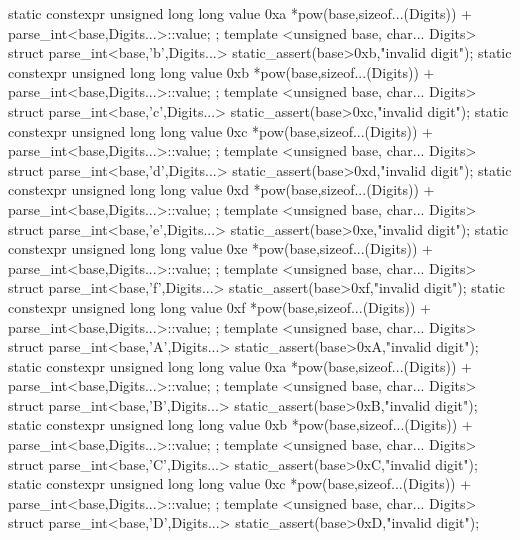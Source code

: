 \documentclass[ebook,11pt,article]{memoir}
\begin{document}
\begin{codeblock}
{{{{    static constexpr unsigned long long value{ 0xa *pow(base,sizeof...(Digits))
                                               + parse_int<base,Digits...>::value};
};
template <unsigned base, char... Digits>
struct parse_int<base,'b',Digits...>{
    static_assert(base>0xb,"invalid digit");
    static constexpr unsigned long long value{ 0xb *pow(base,sizeof...(Digits))
                                               + parse_int<base,Digits...>::value};
};
template <unsigned base, char... Digits>
struct parse_int<base,'c',Digits...>{
    static_assert(base>0xc,"invalid digit");
    static constexpr unsigned long long value{ 0xc *pow(base,sizeof...(Digits))
                                               + parse_int<base,Digits...>::value};
};
template <unsigned base, char... Digits>
struct parse_int<base,'d',Digits...>{
    static_assert(base>0xd,"invalid digit");
    static constexpr unsigned long long value{ 0xd *pow(base,sizeof...(Digits))
                                               + parse_int<base,Digits...>::value};
};
template <unsigned base, char... Digits>
struct parse_int<base,'e',Digits...>{
    static_assert(base>0xe,"invalid digit");
    static constexpr unsigned long long value{ 0xe *pow(base,sizeof...(Digits))
                                               + parse_int<base,Digits...>::value};
};
template <unsigned base, char... Digits>
struct parse_int<base,'f',Digits...>{
    static_assert(base>0xf,"invalid digit");
    static constexpr unsigned long long value{ 0xf *pow(base,sizeof...(Digits))
                                               + parse_int<base,Digits...>::value};
};
template <unsigned base, char... Digits>
struct parse_int<base,'A',Digits...>{
    static_assert(base>0xA,"invalid digit");
    static constexpr unsigned long long value{ 0xa *pow(base,sizeof...(Digits))
                                               + parse_int<base,Digits...>::value};
};
template <unsigned base, char... Digits>
struct parse_int<base,'B',Digits...>{
    static_assert(base>0xB,"invalid digit");
    static constexpr unsigned long long value{ 0xb *pow(base,sizeof...(Digits))
                                               + parse_int<base,Digits...>::value};
};
template <unsigned base, char... Digits>
struct parse_int<base,'C',Digits...>{
    static_assert(base>0xC,"invalid digit");
    static constexpr unsigned long long value{ 0xc *pow(base,sizeof...(Digits))
                                               + parse_int<base,Digits...>::value};
};
template <unsigned base, char... Digits>
struct parse_int<base,'D',Digits...>{
    static_assert(base>0xD,"invalid digit");
}}}}
\end{codeblock}
\end{document}
